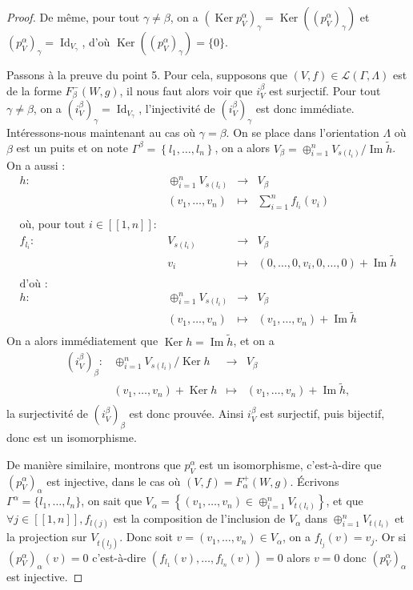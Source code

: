 \documentclass[a4paper,11pt]{article}
\DeclareMathOperator{\Ker}{Ker}
\DeclareMathOperator{\Id}{Id}
\DeclareMathOperator{\Img}{Im}
\begin{document}
\begin{proof}
        De même, pour tout $\gamma\neq\beta$, on a $(\Ker p_{V}^{\alpha})_{\gamma}=\Ker((p_{V}^{\alpha})_{\gamma})$ et $(p_{V}^{\alpha})_{\gamma}=\Id_{V_{\gamma}}$, d'où $\Ker((p_{V}^{\alpha})_{\gamma})=\{0\}$.

	Passons à la preuve du point 5. Pour cela, supposons que $(V,f)\in\mathscr{L}(\Gamma,\Lambda)$ est de la forme $F_{\beta}^{-}(W,g)$, il nous faut alors voir que $i_{V}^{\beta}$ est surjectif. Pour tout $\gamma\neq\beta$, on a $(i_{V}^{\beta})_{\gamma}=\Id_{V_{\gamma}}$, l'injectivité de $(i_{V}^{\beta})_{\gamma}$ est donc immédiate. Intéressons-nous maintenant au cas où $\gamma=\beta$. On se place dans l'orientation $\Lambda$ où $\beta$ est un puits et on note $\Gamma^{\beta}=\left\{ l_{1},\dots,l_{n} \right\}$, on a alors $V_{\beta}=\oplus_{i=1}^{n}V_{s(l_{i})}/\Img \widetilde{h}$. On a aussi :
	\[
\begin{array}{rccc}
	h: & \oplus_{i=1}^{n}V_{s(l_{i})} & \rightarrow & V_{\beta} \\
	& (v_{1},\dots,v_{n}) & \mapsto & \sum_{i=1}^{n}f_{l_{i}}(v_{i})\\
	&&&\\
	\text{où, pour tout }i\in[\![1,n]\!] : &&&\\
	f_{l_{i}}:& V_{s(l_{i})} & \rightarrow & V_{\beta} \\
	& v_{i} & \mapsto & (0,\dots,0,v_{i},0,\dots,0)+\Img \widetilde{h}\\
	&&&\\
	\text{d'où :} &&&\\
	h: & \oplus_{i=1}^{n}V_{s(l_{i})} & \rightarrow & V_{\beta} \\
	& (v_{1},\dots,v_{n}) & \mapsto & (v_{1},\dots,v_{n}) + \Img \widetilde{h}\\
\end{array}
	\]
	On a alors immédiatement que $\Ker h = \Img \widetilde{h}$, et on a
	\[
		\begin{array}{rccc}
			(i_{V}^{\beta})_{\beta} : & \oplus_{i=1}^{n}V_{s(l_{i})}/\Ker h & \rightarrow & V_{\beta}\\
			& (v_{1},\dots,v_{n})+\Ker h & \mapsto & (v_{1},\dots,v_{n})+\Img \widetilde{h},\\
		\end{array}
	\]
	la surjectivité de $(i_{V}^{\beta})_{\beta}$ est donc prouvée. Ainsi $i_{V}^{\beta}$ est surjectif, puis bijectif, donc est un isomorphisme.

        De manière similaire, montrons que $p_{V}^{\alpha}$ est un isomorphisme, c'est-à-dire que $(p_{V}^{\alpha})_{\alpha}$ est injective, dans le cas où $(V,f) = F_{\alpha}^{+}(W,g)$. Écrivons $\Gamma^{\alpha} = \{l_{1}, \dots, l_{n}\}$, on sait que $V_{\alpha} = \left\{ (v_{1}, \dots, v_{n}) \in \oplus_{i=1}^{n}  V_{t(l_{i})}\right\}$, et que $\forall j \in [\![1,n]\!] , f_{l(j)}$ est la composition de l'inclusion de $V_{\alpha}$ dans $\oplus_{i=1}^{n}V_{t(l_{i})}$ et la projection sur $V_{t(l_{j})}$. Donc soit $v= (v_{1}, \dots, v_{n}) \in V_{\alpha}$, on a $ f_{l_{j}}(v) = v_{j}$. Or si $(p_{V}^{\alpha})_{\alpha}(v) = 0 $ c'est-à-dire $(f_{l_{1}}(v), \dots, f_{l_{n}}(v)) = 0 $ alors $v = 0$ donc $(p_{V}^{\alpha})_{\alpha}$ est injective.



\end{proof}
\end{document}
